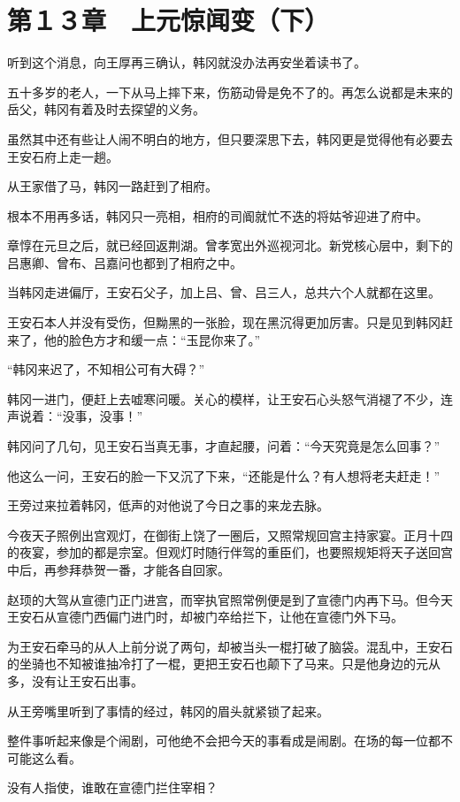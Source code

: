\section{第１３章　上元惊闻变（下）}

听到这个消息，向王厚再三确认，韩冈就没办法再安坐着读书了。

五十多岁的老人，一下从马上摔下来，伤筋动骨是免不了的。再怎么说都是未来的岳父，韩冈有着及时去探望的义务。

虽然其中还有些让人闹不明白的地方，但只要深思下去，韩冈更是觉得他有必要去王安石府上走一趟。

从王家借了马，韩冈一路赶到了相府。

根本不用再多话，韩冈只一亮相，相府的司阍就忙不迭的将姑爷迎进了府中。

章惇在元旦之后，就已经回返荆湖。曾孝宽出外巡视河北。新党核心层中，剩下的吕惠卿、曾布、吕嘉问也都到了相府之中。

当韩冈走进偏厅，王安石父子，加上吕、曾、吕三人，总共六个人就都在这里。

王安石本人并没有受伤，但黝黑的一张脸，现在黑沉得更加厉害。只是见到韩冈赶来了，他的脸色方才和缓一点：“玉昆你来了。”

“韩冈来迟了，不知相公可有大碍？”

韩冈一进门，便赶上去嘘寒问暖。关心的模样，让王安石心头怒气消褪了不少，连声说着：“没事，没事！”

韩冈问了几句，见王安石当真无事，才直起腰，问着：“今天究竟是怎么回事？”

他这么一问，王安石的脸一下又沉了下来，“还能是什么？有人想将老夫赶走！”

王旁过来拉着韩冈，低声的对他说了今日之事的来龙去脉。

今夜天子照例出宫观灯，在御街上饶了一圈后，又照常规回宫主持家宴。正月十四的夜宴，参加的都是宗室。但观灯时随行伴驾的重臣们，也要照规矩将天子送回宫中后，再参拜恭贺一番，才能各自回家。

赵顼的大驾从宣德门正门进宫，而宰执官照常例便是到了宣德门内再下马。但今天王安石从宣德门西偏门进门时，却被门卒给拦下，让他在宣德门外下马。

为王安石牵马的从人上前分说了两句，却被当头一棍打破了脑袋。混乱中，王安石的坐骑也不知被谁抽冷打了一棍，更把王安石也颠下了马来。只是他身边的元从多，没有让王安石出事。

从王旁嘴里听到了事情的经过，韩冈的眉头就紧锁了起来。

整件事听起来像是个闹剧，可他绝不会把今天的事看成是闹剧。在场的每一位都不可能这么看。

没有人指使，谁敢在宣德门拦住宰相？

